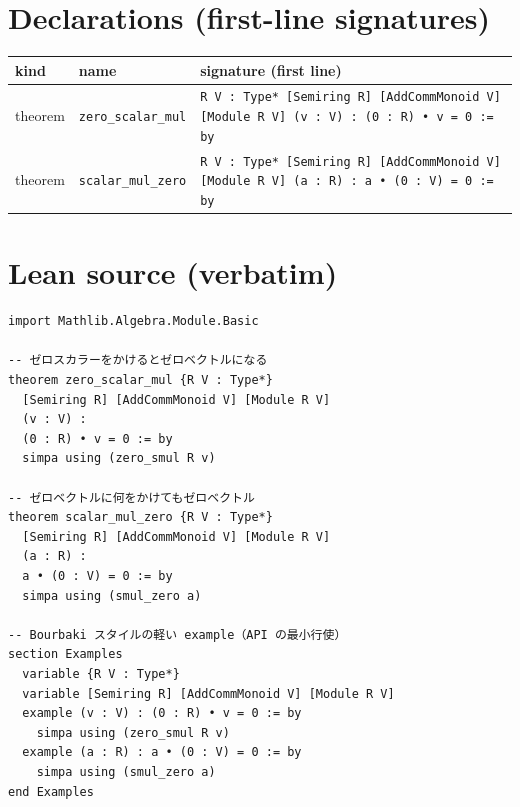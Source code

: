 \documentclass[12pt]{article}
\begin{document}
\section*{Declarations (first-line signatures)} 
\begin{center}
\begin{tabular}{lll}
\textbf{kind} & \textbf{name} & \textbf{signature (first line)} \\ \hline
theorem & \texttt{zero\_scalar\_mul} & \texttt{{R V : Type*} [Semiring R] [AddCommMonoid V] [Module R V] (v : V) : (0 : R) • v = 0 := by} \\
theorem & \texttt{scalar\_mul\_zero} & \texttt{{R V : Type*} [Semiring R] [AddCommMonoid V] [Module R V] (a : R) : a • (0 : V) = 0 := by} \\
\end{tabular}
\end{center}

\section*{Lean source (verbatim)}
\begin{lstlisting}
import Mathlib.Algebra.Module.Basic

-- ゼロスカラーをかけるとゼロベクトルになる
theorem zero_scalar_mul {R V : Type*} 
  [Semiring R] [AddCommMonoid V] [Module R V]
  (v : V) : 
  (0 : R) • v = 0 := by
  simpa using (zero_smul R v)
  
-- ゼロベクトルに何をかけてもゼロベクトル
theorem scalar_mul_zero {R V : Type*} 
  [Semiring R] [AddCommMonoid V] [Module R V]
  (a : R) : 
  a • (0 : V) = 0 := by
  simpa using (smul_zero a)

-- Bourbaki スタイルの軽い example（API の最小行使）
section Examples
  variable {R V : Type*}
  variable [Semiring R] [AddCommMonoid V] [Module R V]
  example (v : V) : (0 : R) • v = 0 := by
    simpa using (zero_smul R v)
  example (a : R) : a • (0 : V) = 0 := by
    simpa using (smul_zero a)
end Examples

\end{lstlisting}
\end{document}
